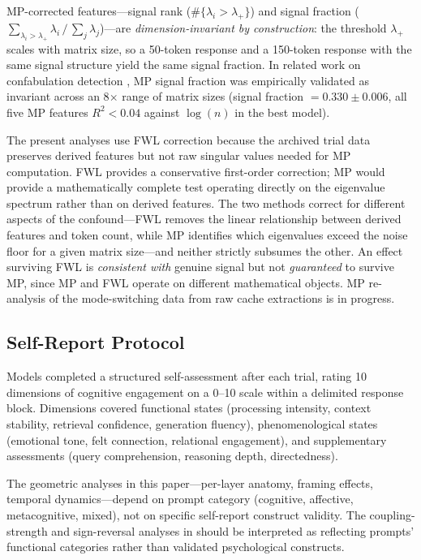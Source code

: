 \documentclass[11pt,a4paper]{article}
\begin{document}
MP-corrected features---signal rank ($\#\{\lambda_i > \lambda_+\}$) and
signal fraction ($\sum_{\lambda_i > \lambda_+} \lambda_i \,/\,
\sum_j \lambda_j$)---are \emph{dimension-invariant by construction}:
the threshold $\lambda_+$ scales with matrix size, so a 50-token response
and a 150-token response with the same signal structure yield the same
signal fraction. In related work on confabulation detection
\citep{lyra2026oracle}, MP signal fraction was empirically validated as
invariant across an 8$\times$ range of matrix sizes (signal fraction
$= 0.330 \pm 0.006$, all five MP features $R^2 < 0.04$ against
$\log(n)$ in the best model).

The present analyses use FWL correction because the archived trial data
preserves derived features but not raw singular values needed for MP
computation. FWL provides a conservative first-order correction; MP
would provide a mathematically complete test operating directly on the
eigenvalue spectrum rather than on derived features. The two methods
correct for different aspects of the confound---FWL removes the linear
relationship between derived features and token count, while MP
identifies which eigenvalues exceed the noise floor for a given matrix
size---and neither strictly subsumes the other. An effect surviving FWL
is \emph{consistent with} genuine signal but not \emph{guaranteed} to
survive MP, since MP and FWL operate on different mathematical objects.
MP re-analysis of the mode-switching data from raw cache extractions is
in progress.

\subsection{Self-Report Protocol}

Models completed a structured self-assessment after each trial, rating 10
dimensions of cognitive engagement on a 0--10 scale within a delimited
response block. Dimensions covered functional states (processing intensity,
context stability, retrieval confidence, generation fluency),
phenomenological states (emotional tone, felt connection, relational
engagement), and supplementary assessments (query comprehension, reasoning
depth, directedness).

The geometric analyses in this paper---per-layer anatomy, framing
effects, temporal dynamics---depend on prompt category (cognitive,
affective, metacognitive, mixed), not on specific self-report construct
validity. The coupling-strength and sign-reversal analyses in
 should be interpreted as
reflecting prompts' functional categories rather than validated
psychological constructs.
\end{document}
